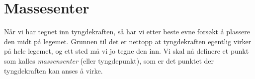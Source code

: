 
\section{Massesenter}

Når vi har tegnet inn tyngdekraften, så har vi etter beste evne forsøkt å plassere den midt på legemet. Grunnen til det er nettopp at tyngdekraften egentlig virker på hele legemet, og ett sted må vi jo  tegne den inn. Vi skal nå definere et punkt som kalles \emph{massensenter} (eller tyngdepunkt), som er det punktet der tyngdekraften kan anses å virke.


